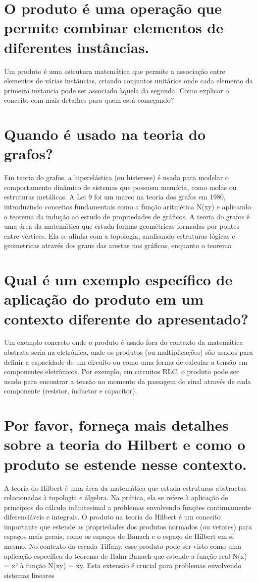 \documentclass[11pt,a4paper]{article}
\begin{document}
\section{O produto é uma operação que permite combinar elementos de diferentes instâncias.}
Um produto é uma estrutura matemática que permite a associação entre elementos de várias instâncias, criando conjuntos unitários onde cada elemento da primeira instancia pode ser associado àquela da segunda. Como explicar o conceito com mais detalhes para quem está começando?

\section{Quando é usado na teoria do grafos?}
Em teoria do grafos, a hiperelástica (ou histerese) é usada para modelar o comportamento dinâmico de sistemas que possuem memória, como molas ou estruturas metálicas. A Lei 9 foi um marco na teoria dos grafos em 1980, introduzindo conceitos fundamentais como a função aritmética N(xy) e aplicando o teorema da indução ao estudo de propriedades de gráficos. A teoria do grafos é uma área da matemática que estuda formas geométricas formadas por pontes entre vértices. Ela se alinha com a topologia, analisando estruturas lógicas e geometricas através dos graus das arestas nos gráficos, enquanto o teorema

\section{Qual é um exemplo específico de aplicação do produto em um contexto diferente do apresentado?}
Um exemplo concreto onde o produto é usado fora do contexto da matemática abstrata seria na eletrônica, onde os produtos (ou multiplicações) são usados para definir a capacidade de um circuito ou como uma forma de calcular a tensão em componentes eletrônicos. Por exemplo, em circuitos RLC, o produto pode ser usado para encontrar a tensão no momento da passagem do sinal através de cada componente (resistor, inductor e capacitor).

\section{Por favor, forneça mais detalhes sobre a teoria do Hilbert e como o produto se estende nesse contexto.}
A teoria do Hilbert é uma área da matemática que estuda estruturas abstractas relacionadas à topologia e álgebra. Na prática, ela se refere à aplicação de princípios do cálculo infinitesimal a problemas envolvendo funções continuamente diferenciáveis e integrais. O produto na teoria do Hilbert é um conceito importante que estende as propriedades dos produtos normados (ou vetores) para espaços mais gerais, como os espaços de Banach e o espaço de Hilbert em si mesmo. No contexto da escada Tiffany, esse produto pode ser visto como uma aplicação específica do teorema de Hahn-Banach que estende a função real N(x) = x² à função N(xy) = xy. Esta extensão é crucial para problemas envolvendo sistemas lineares
\end{document}
